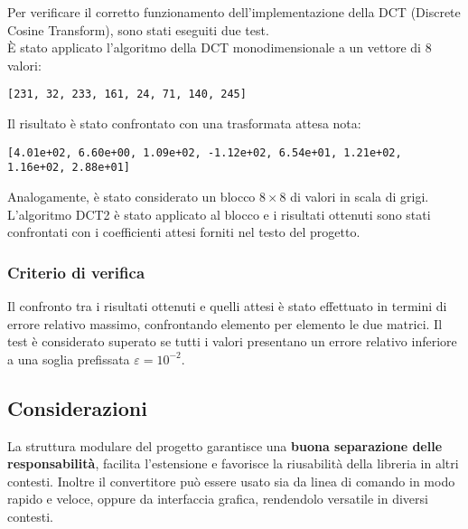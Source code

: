 Per verificare il corretto funzionamento dell'implementazione della DCT (Discrete Cosine Transform), sono stati eseguiti due test.\\

È stato applicato l'algoritmo della DCT monodimensionale a un vettore di 8 valori:
\begin{center}
\texttt{[231, 32, 233, 161, 24, 71, 140, 245]}
\end{center}
Il risultato è stato confrontato con una trasformata attesa nota:
\begin{center}
\texttt{[4.01e+02, 6.60e+00, 1.09e+02, -1.12e+02, 6.54e+01, 1.21e+02, 1.16e+02, 2.88e+01]}
\end{center}

Analogamente, è stato considerato un blocco $8 \times 8$ di valori in scala di grigi. L'algoritmo DCT2 è stato applicato al blocco e i risultati ottenuti sono stati confrontati con i coefficienti attesi forniti nel testo del progetto.

\subsubsection*{Criterio di verifica}
Il confronto tra i risultati ottenuti e quelli attesi è stato effettuato in termini di errore relativo massimo, confrontando elemento per elemento le due matrici. Il test è considerato superato se tutti i valori presentano un errore relativo inferiore a una soglia prefissata $\varepsilon = 10^{-2}$.


\subsection{Considerazioni}

La struttura modulare del progetto garantisce una \textbf{buona separazione delle responsabilità}, facilita l’estensione e favorisce la riusabilità della libreria in altri contesti. Inoltre il convertitore può essere usato sia da linea di comando in modo rapido e veloce, oppure da interfaccia grafica, rendendolo versatile in diversi contesti.